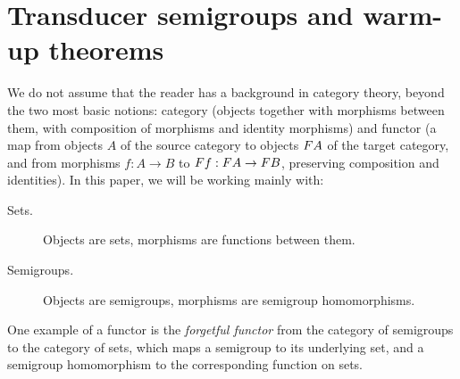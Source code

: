 \section{Transducer semigroups and warm-up theorems}\label{sec:warm-up}
We do not assume that the reader has a background in category theory, beyond the two most basic notions: category (objects together with morphisms between them, with composition of morphisms and identity morphisms) and functor (a map from objects $A$ of the source category to objects $\functor A$ of the target category, and from morphisms $f : A \to B$ to $\functor f : \functor A \to \functor B$, preserving composition and identities). In this paper, we will be working mainly with:
\begin{description}
    \item[Sets.] Objects are sets,  morphisms are functions between them.
    \item[Semigroups.] Objects are semigroups,  morphisms are semigroup homomorphisms.
\end{description}

One example of a functor is the \emph{forgetful functor} from the category of semigroups to the category of sets, which maps a semigroup to its underlying set, and a semigroup homomorphism to the corresponding function on sets. 

